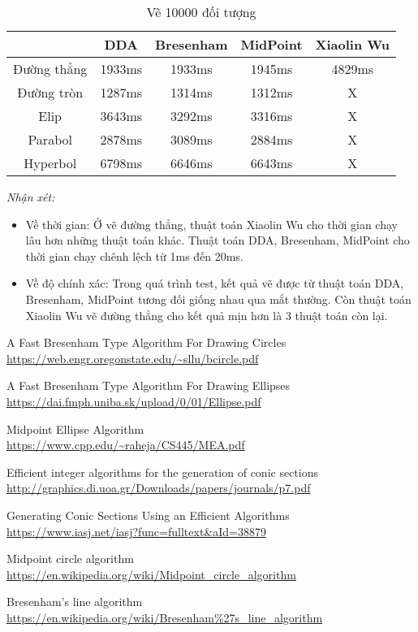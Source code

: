 \documentclass[12pt]{article}
\begin{document}
\begin{table}[H]
\begin{tabular}{| c || c | c | c | c |}
\hline
& DDA & Bresenham & MidPoint & Xiaolin Wu \\
\hline \hline
Đường thẳng & 1933ms & 1933ms & 1945ms & 4829ms \\
\hline
Đường tròn & 1287ms & 1314ms & 1312ms & X \\
\hline
Elip & 3643ms & 3292ms & 3316ms & X \\
\hline
Parabol & 2878ms & 3089ms & 2884ms & X \\
\hline
Hyperbol & 6798ms & 6646ms & 6643ms & X \\
\hline
\end{tabular}
\caption{Vẽ 10000 đối tượng}
\end{table}

\emph{Nhận xét:}
\begin{itemize}
\item Về thời gian: Ở vẽ đường thẳng, thuật toán Xiaolin Wu cho thời gian chạy lâu hơn những thuật toán khác.
Thuật toán DDA, Bresenham, MidPoint cho thời gian chạy chênh lệch từ 1ms đến 20ms.
\item Về độ chính xác: Trong quá trình test, kết quả vẽ được từ thuật toán DDA, Bresenham, MidPoint tương đối giống nhau qua mắt thường.
Còn thuật toán Xiaolin Wu vẽ đường thẳng cho kết quả mịn hơn là 3 thuật toán còn lại.
\end{itemize}

\begin{thebibliography}{1}
A Fast Bresenham Type Algorithm For Drawing Circles \\
\url{https://web.engr.oregonstate.edu/~sllu/bcircle.pdf}

A Fast Bresenham Type Algorithm For Drawing Ellipses \\
\url{https://dai.fmph.uniba.sk/upload/0/01/Ellipse.pdf}

Midpoint Ellipse Algorithm \\
\url{https://www.cpp.edu/~raheja/CS445/MEA.pdf}

Efficient integer algorithms for the generation of conic sections \\
\url{http://graphics.di.uoa.gr/Downloads/papers/journals/p7.pdf}

Generating Conic Sections Using an Efficient Algorithms \\
\url{https://www.iasj.net/iasj?func=fulltext&aId=38879}

Midpoint circle algorithm \\
\url{https://en.wikipedia.org/wiki/Midpoint_circle_algorithm}

Bresenham's line algorithm \\
\url{https://en.wikipedia.org/wiki/Bresenham%27s_line_algorithm}
\end{thebibliography}
\end{document}
